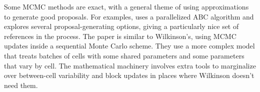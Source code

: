 \documentclass{article}
\begin{document}
Some MCMC methods are exact, with a general theme of using approximations to generate good proposals. For examples, \cite{owen2014scalable} uses a parallelized ABC algorithm and \cite{golightly2014smc_b_subtilis} explores several proposal-generating options, giving a particularly nice set of references in the process. %
The paper \cite{zechner2014scalable} is similar to Wilkinson's, using MCMC updates inside a sequential Monte Carlo scheme. They use a more complex model that treats batches of cells with some shared parameters and some parameters that vary by cell. The mathematical machinery involves extra tools to marginalize over between-cell variability and block updates in places where Wilkinson doesn't need them.



\begin{align*}
\end{align*}
\begin{align*}
\end{align*}
\begin{align*}
\end{align*}
\begin{align*}
\end{align*}

%





\end{document}
